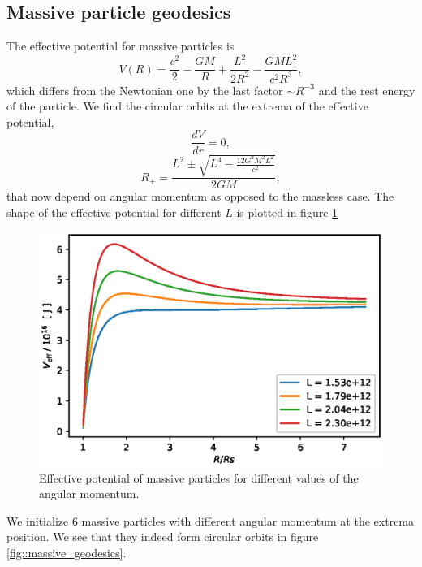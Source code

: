 \documentclass[journal, a4paper]{IEEEtran}
\begin{document}
\subsection{Massive particle geodesics}
The effective potential for massive particles is
\begin{equation}
	V(R) = \frac{c^2}{2} - \frac{GM}{R} + \frac{L^2}{2R^2} - \frac{GML^2}{c^2R^3},
\end{equation}
which differs from the Newtonian one by the last factor $\sim R^{-3}$ and the rest energy of the particle. We find the circular orbits at the extrema of the effective potential,
\begin{equation}
	\frac{dV}{dr} = 0,
\end{equation}
\begin{equation}
	R_{\pm} = \frac{L^2 \pm \sqrt{ L^4 - \frac{12 G^2 M^2 L^2}{ c^2} } }{2 G M},
\end{equation}
that now depend on angular momentum as opposed to the massless case. The shape of the effective potential for different $L$ is plotted in figure \ref{fig::Veff_massive}
\begin{figure}[!hbt]
	\begin{center}
	\includegraphics[width=\columnwidth]{Veff_massive.eps}
	\caption{Effective potential of massive particles for different values of the angular momentum.}
	\label{fig::Veff_massive}
\end{center}
\end{figure}
We initialize 6 massive particles with different angular momentum at the extrema position. We see that they indeed form circular orbits in figure \ref{fig::massive_geodesics}.
\end{document}
